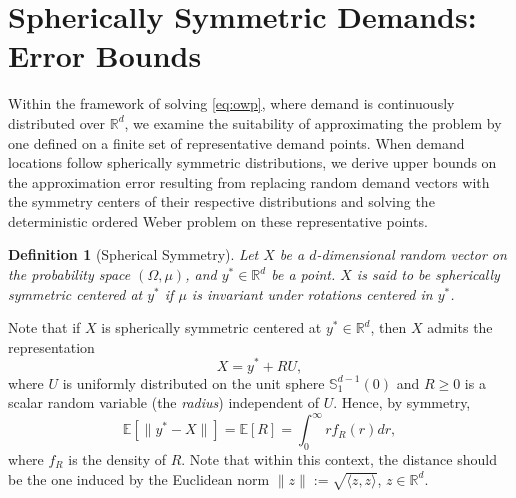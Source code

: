 \documentclass[letter,11pt, reqno]{amsart}
\newcommand{\R}{\mathbb{R}}
\newcommand{\E}{\mathbb{E}}
\renewcommand{\;}{\quad}
\theoremstyle{thmstyleone}%
\theoremstyle{thmstyletwo}%
\theoremstyle{thmstylethree}%
\newtheorem{definition}{Definition}%
\begin{document}
\section{Spherically Symmetric Demands: Error Bounds}\label{sec:sym}

Within the framework of solving \ref{eq:owp}, where demand is continuously distributed over $\R^d$, we examine the suitability of approximating the problem by one defined on a finite set of representative demand points. When demand locations follow spherically symmetric distributions, we derive upper bounds on the approximation error resulting from replacing random demand vectors with the symmetry centers of their respective distributions and solving the deterministic ordered Weber problem on these representative points.

\begin{definition}[Spherical Symmetry]
    Let $X$ be a $d$-dimensional random vector on the probability space $(\Omega,\mu)$,  and $y^* \in \R^d$ be a point. $X$ is said to be \emph{spherically symmetric} centered at $y^*$ if $\mu$ is invariant under rotations centered in $y^*$.
\end{definition}

Note that if $X$ is spherically symmetric
 centered at $y^*\in\mathbb{R}^d$, then $X$ admits the representation
\begin{equation*}
    X =y^* + RU,
\end{equation*}
where $U$ is uniformly distributed on the unit sphere $\mathbb{S}^{d-1}_1(0)$
and $R\geq 0$ is a scalar random variable (the \emph{radius}) independent of $U$.
Hence, by symmetry,
\begin{equation*}
    \E \left[\|y^*-X\|\right]= \E\left[R\right] = \int_0^{\infty} rf_R(r)dr,
\end{equation*}
where $f_R$ is the density of $R$. Note that within this context, the distance should be the one induced by the Euclidean norm $\|z \|:=\sqrt{\langle z,z\rangle}$, $z\in \R^d$.
\end{document}
